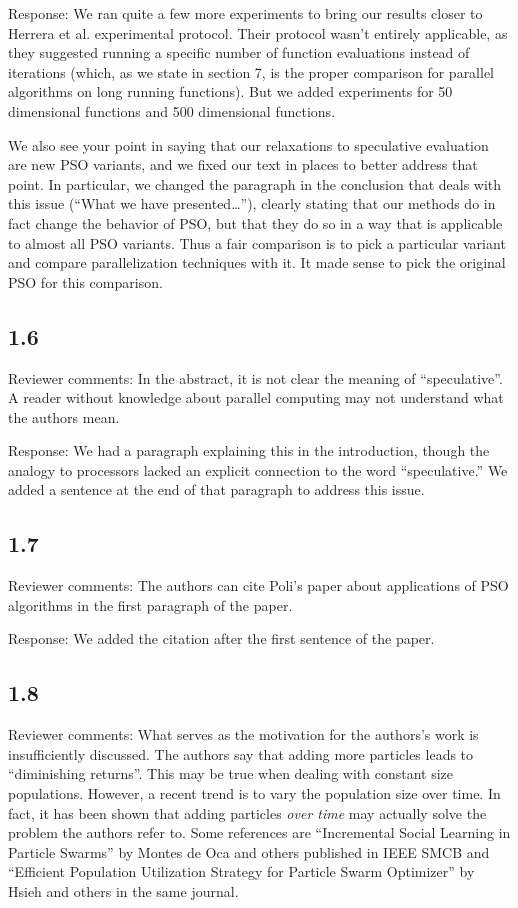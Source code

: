 \documentclass[onecolumn, 12pt]{article}
\begin{document}
Response: We ran quite a few more experiments to bring our results closer to
Herrera et al. experimental protocol.  Their protocol wasn't entirely
applicable, as they suggested running a specific number of function evaluations
instead of iterations (which, as we state in section 7, is the proper
comparison for parallel algorithms on long running functions).  But we added
experiments for 50 dimensional functions and 500 dimensional functions.

We also see your point in saying that our relaxations to speculative evaluation
are new PSO variants, and we fixed our text in places to better address that
point.  In particular, we changed the paragraph in the conclusion that deals
with this issue (``What we have presented\ldots''), clearly stating that our
methods do in fact change the behavior of PSO, but that they do so in a way
that is applicable to almost all PSO variants.  Thus a fair comparison is to
pick a particular variant and compare parallelization techniques with it.  It
made sense to pick the original PSO for this comparison.

\subsection*{1.6}

Reviewer comments: In the abstract, it is not clear the meaning of
``speculative''. A reader without knowledge about parallel computing may not
understand what the authors mean.

Response: We had a paragraph explaining this in the introduction, though the
analogy to processors lacked an explicit connection to the word
``speculative.''  We added a sentence at the end of that paragraph to address
this issue.

\subsection*{1.7}

Reviewer comments: The authors can cite Poli's paper about applications of PSO
algorithms in the first paragraph of the paper.

Response: We added the citation after the first sentence of the paper.

\subsection*{1.8}

Reviewer comments: What serves as the motivation for the authors's work is
insufficiently discussed.  The authors say that adding more particles leads to
``diminishing returns''. This may be true when dealing with constant size
populations.  However, a recent trend is to vary the population size over time.
In fact, it has been shown that adding particles \emph{over time} may actually
solve the problem the authors refer to. Some references are ``Incremental
Social Learning in Particle Swarms'' by Montes de Oca and others published in
IEEE SMCB and ``Efficient Population Utilization Strategy for Particle Swarm
Optimizer'' by Hsieh and others in the same journal.
\end{document}
